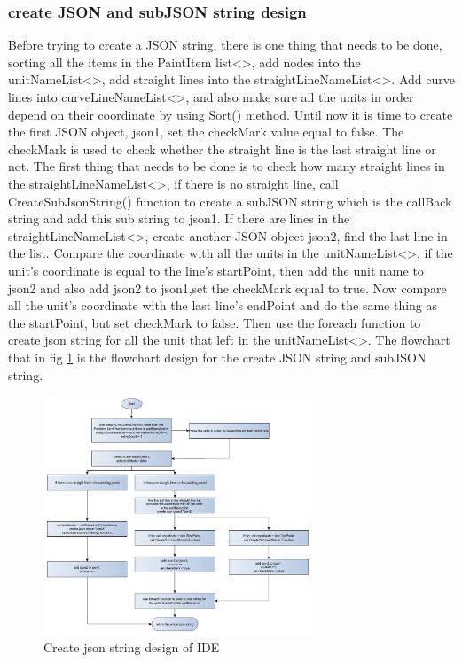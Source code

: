 \subsubsection*{create JSON and subJSON string design}
\noindent
Before trying to create a JSON string, there is one thing that needs to be done, sorting all the items in the PaintItem list<>, add nodes into the unitNameList<>, add straight lines into the straightLineNameList<>. Add curve lines into curveLineNameList<>, and also make sure all the units in order depend on their coordinate by using Sort() method. Until now it is time to create the first JSON object, json1, set the checkMark value equal to false. The checkMark is used to check whether the straight line is the last straight line or not.
 The first thing that needs to be done is to check how many straight lines in the straightLineNameList<>, if there is no straight line, call CreateSubJsonString() function to create a subJSON string which is the callBack string and add this sub string to json1. If there are lines in the straightLineNameList<>, create another JSON object json2, find the last line in the list. Compare the coordinate with all the units in the unitNameList<>, if the unit's coordinate is equal to the line's startPoint, then add the unit name to json2 and also add json2 to json1,set the checkMark equal to true. Now compare all the unit's coordinate with the last line's endPoint and do the same thing as the startPoint, but set checkMark to false. Then use the foreach function to create json string for all the unit that left in the unitNameList<>.
 The flowchart that in fig \ref{Generate_Json_string} is the flowchart design for the create JSON string and subJSON string.
\begin{figure}[!ht]
	\begin{center}
		\includegraphics[width=80mm]{./Images/Software/Generate_Json_string.png}
		\caption{Create json string design of IDE}
		\label{Generate_Json_string}
	\end{center}
\end{figure}
